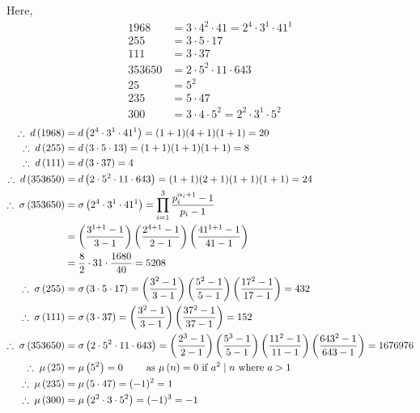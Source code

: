 \documentclass[12pt]{book}
\begin{document}
\begin{soln}
    Here,
    \begin{align*}
        1968&=3\cdot 4^2\cdot 41=2^4\cdot 3^1 \cdot 41^1\\
        255&=3\cdot 5\cdot 17\\
        111&=3\cdot 37\\
        353650&=2\cdot 5^2\cdot 11\cdot 643\\
        25&=5^2\\
        235&=5\cdot 47\\
        300&=3\cdot 4\cdot 5^2=2^2\cdot 3^1\cdot 5^2
    \end{align*}
    \begin{align*}
        \therefore\; d\left( 1968 \right)&=d\left( 2^4\cdot 3^1 \cdot 41^1 \right)=(1+1)(4+1)(1+1)=20\\
        \therefore\; d\left( 255 \right)&=d\left( 3\cdot 5 \cdot 13 \right)=(1+1)(1+1)(1+1)=8\\
        \therefore\; d\left( 111 \right)&=d\left( 3\cdot 37 \right)=4\\
        \therefore\; d\left( 353650 \right)&=d\left( 2\cdot 5^2\cdot 11\cdot 643 \right)=(1+1)(2+1)(1+1)(1+1)=24\\
        \therefore\; \sigma\left( 353650 \right)&=\sigma\left( 2^4\cdot 3^1 \cdot 41^1 \right)=\prod_{i=1}^3 \frac{p_i^{\alpha_i+1}-1}{p_i-1}\\
        &=\left( \frac{3^{1+1}-1}{3-1} \right)\left( \frac{2^{4+1}-1}{2-1} \right)\left( \frac{41^{1+1}-1}{41-1} \right)\\
        &=\frac{8}{2} \cdot 31 \cdot \frac{1680}{40}=5208\\
        \therefore\; \sigma\left( 255 \right)&=\sigma\left( 3\cdot 5 \cdot 17 \right)=\left( \frac{3^{2}-1}{3-1} \right)\left( \frac{5^{2}-1}{5-1} \right)\left( \frac{17^{2}-1}{17-1} \right)=432\\
        \therefore\; \sigma\left( 111 \right)&=\sigma\left( 3\cdot 37 \right)=\left( \frac{3^{2}-1}{3-1} \right)\left( \frac{37^{2}-1}{37-1} \right)=152\\
        \therefore\; \sigma\left( 353650 \right)&=\sigma\left( 2\cdot 5^2\cdot 11\cdot 643 \right)=\left( \frac{2^{3}-1}{2-1} \right)\left( \frac{5^{3}-1}{5-1} \right)\left( \frac{11^2-1}{11-1} \right)\left( \frac{643^2-1}{643-1} \right)=1676976\\
        \therefore\; \mu\left( 25 \right)&=\mu\left( 5^2 \right)=0 \qquad \text{ as } \mu\left( n \right)=0 \text{ if } a^2\mid n \text{ where } a>1\\
        \therefore\; \mu\left( 235 \right)&=\mu\left( 5\cdot 47 \right)=(-1)^2=1\\
        \therefore\; \mu\left( 300 \right)&=\mu\left( 2^2\cdot 3\cdot 5^2 \right)=(-1)^3=-1
    \end{align*}
\end{soln}
\end{document}
